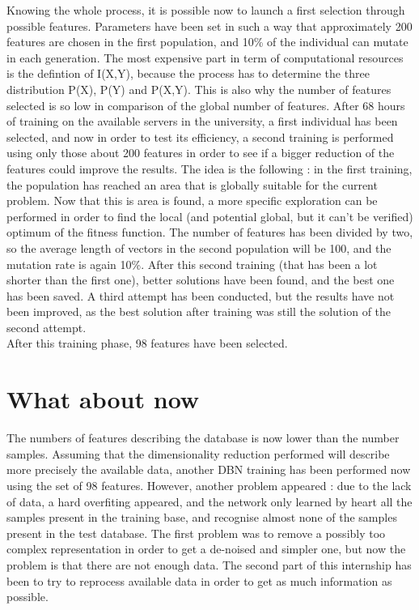 \documentclass{report}
\begin{document}
			
			Knowing the whole process, it is possible now to launch a first selection through possible features. Parameters have been set in such a way that approximately 200 features are chosen in the first population, and 10\% of the individual can mutate in each generation. The most expensive part in term of computational resources is the defintion of I(X,Y), because the process has to determine the three distribution P(X), P(Y) and P(X,Y). This is also why the number of features selected is so low in comparison of the global number of features. After 68 hours of training on the available servers in the university, a first individual has been selected, and now in order to test its efficiency, a second training is performed using only those about 200 features in order to see if a bigger reduction of the features could improve the results. The idea is the following : in the first training, the population has reached an area that is globally suitable for the current problem. Now that this is area is found, a more specific exploration can be performed in order to find the local (and potential global, but it can't be verified) optimum of the fitness function. The number of features has been divided by two, so the average length of vectors in the second population will be 100, and the mutation rate is again 10\%. After this second training (that has been a lot shorter than the first one), better solutions have been found, and the best one has been saved. A third attempt has been conducted, but the results have not been improved, as the best solution after training was still the solution of the second attempt.\\
			
			After this training phase, 98 features have been selected.
		
		\section{What about now}
		
			The numbers of features describing the database is now lower than the number samples. Assuming that the dimensionality reduction performed will describe more precisely the available data, another DBN training has been performed now using the set of 98 features. However, another problem appeared : due to the lack of data, a hard overfiting appeared, and the network only learned by heart all the samples present in the training base, and recognise almost none of the samples present in the test database. The first problem was to remove a possibly too complex representation in order to get a de-noised and simpler one, but now the problem is that there are not enough data. The second part of this internship has been to try to reprocess available data in order to get as much information as possible.
		
\end{document}
